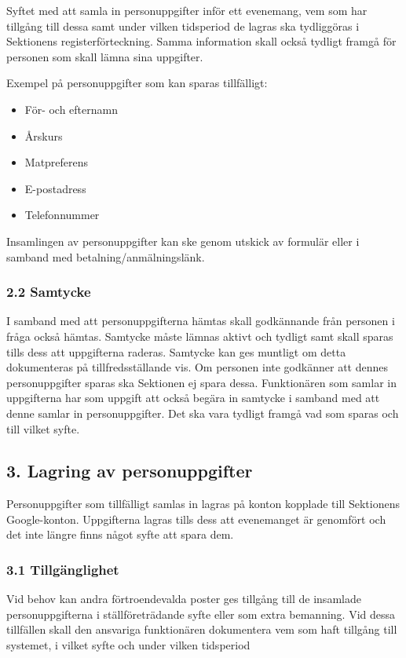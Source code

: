 \documentclass{dsekkallelse}
\begin{document}
Syftet med att samla in personuppgifter inför ett evenemang, vem som har tillgång till dessa samt under vilken tidsperiod de lagras ska tydliggöras i Sektionens registerförteckning. Samma information skall också tydligt framgå för personen som skall lämna sina uppgifter.

Exempel på personuppgifter som kan sparas tillfälligt: 
\begin{itemize}
\item För- och efternamn
\item Årskurs 
\item Matpreferens 
\item E-postadress 
\item Telefonnummer
\end{itemize}

Insamlingen av personuppgifter kan ske genom utskick av formulär eller i samband med betalning/anmälningslänk. 

\subsubsection{2.2 Samtycke}

I samband med att personuppgifterna hämtas skall godkännande från personen i fråga också hämtas. Samtycke måste lämnas aktivt och tydligt samt skall sparas tills dess att uppgifterna raderas. Samtycke kan ges muntligt om detta dokumenteras på tillfredsställande vis. Om personen inte godkänner att dennes personuppgifter sparas ska Sektionen ej spara dessa. Funktionären som samlar in uppgifterna har som uppgift att också begära in samtycke i samband med att denne samlar in personuppgifter. Det ska vara tydligt framgå vad som sparas och till vilket syfte.

\subsection{3. Lagring av personuppgifter}
Personuppgifter som tillfälligt samlas in lagras på konton kopplade till Sektionens Google-konton. Uppgifterna lagras tills dess att evenemanget är genomfört och det inte längre finns något syfte att spara dem.

\subsubsection{3.1 Tillgänglighet}

Vid behov kan andra förtroendevalda poster ges tillgång till de insamlade personuppgifterna i ställföreträdande syfte eller som extra bemanning. Vid dessa tillfällen skall den ansvariga funktionären dokumentera vem som haft tillgång till systemet, i vilket syfte och under vilken tidsperiod
\end{document}

